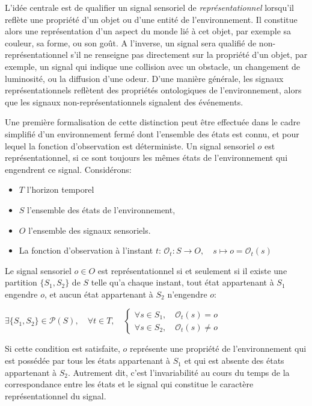 L'idée centrale est de qualifier un signal sensoriel de \emph{représentationnel} lorsqu'il reflète une propriété d'un objet ou d'une entité de l'environnement. 
Il constitue alors une représentation d'un aspect du monde lié à cet objet, par exemple sa couleur, sa forme, ou son goût.
A l'inverse, un signal sera qualifié de non-représentationnel s'il ne renseigne pas directement sur la propriété d'un objet, par exemple, un signal qui indique une collision avec un obstacle, un changement de luminosité, ou la diffusion d'une odeur. 
D'une manière générale, les signaux représentationnels reflètent des propriétés ontologiques de l'environnement, alors que les signaux non-représentationnels signalent des événements.  

Une première formalisation de cette distinction peut être effectuée dans le cadre simplifié d'un environnement fermé dont l'ensemble des états est connu, et pour lequel la fonction d'observation est déterministe.
Un signal sensoriel $o$ est représentationnel, si ce sont toujours les mêmes états de l'environnement qui engendrent ce signal.
Considérons:

\begin{itemize}[label=\scalebox{.85}{$\diamond$}]
	\item $T$ l'horizon temporel
	\item $S$ l'ensemble des états de l'environnement, 
	\item $O$ l'ensemble des signaux sensoriels. 
	\item La fonction d'observation à l'instant $t$: $ \mathcal{O}_t: S \to O,\quad s \mapsto o = \mathcal{O}_t(s)$ 
\end{itemize}

Le signal sensoriel $o \in O$ est représentationnel si et seulement si il existe une partition $\{S_1, S_2\}$ de $S$ telle qu'a chaque instant, tout état appartenant à $S_1$ engendre  $o$, et aucun état appartenant à $S_2$ n'engendre $o$:

$
\exists \{S_1, S_2\} \in \mathcal{P}(S) ,\quad \forall t \in T,\quad 
\left\{
\begin{array}{l}
	\forall s \in S_1,\quad \mathcal{O}_t(s) = o \\
	\forall s \in S_2,\quad \mathcal{O}_t(s) \ne o
\end{array}
\right.
$

Si cette condition est satisfaite, $o$ représente une propriété de l'environnement qui est possédée par tous les états appartenant à $S_1$ et qui est absente des états appartenant à $S_2$.
Autrement dit, c'est l'invariabilité au cours du temps de la correspondance entre les états et le signal qui constitue le caractère représentationnel du signal.

